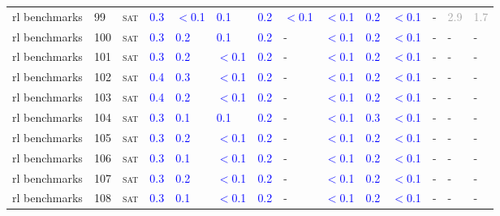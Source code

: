 \begin{center}
{\begin{longtable}{@{}llllllllllllll@{}}
rl benchmarks & 99 & \textsc{sat} & \textcolor{blue}{0.3} & \textcolor{blue}{$<$0.1} & \textcolor{blue}{0.1} & \textcolor{blue}{0.2} & \textcolor{blue}{$<$0.1} & \textcolor{blue}{$<$0.1} & \textcolor{blue}{0.2} & \textcolor{blue}{$<$0.1} & - & \textcolor{darkgray}{2.9} & \textcolor{darkgray}{1.7} \\
rl benchmarks & 100 & \textsc{sat} & \textcolor{blue}{0.3} & \textcolor{blue}{0.2} & \textcolor{blue}{0.1} & \textcolor{blue}{0.2} & - & \textcolor{blue}{$<$0.1} & \textcolor{blue}{0.2} & \textcolor{blue}{$<$0.1} & - & - & - \\
rl benchmarks & 101 & \textsc{sat} & \textcolor{blue}{0.3} & \textcolor{blue}{0.2} & \textcolor{blue}{$<$0.1} & \textcolor{blue}{0.2} & - & \textcolor{blue}{$<$0.1} & \textcolor{blue}{0.2} & \textcolor{blue}{$<$0.1} & - & - & - \\
rl benchmarks & 102 & \textsc{sat} & \textcolor{blue}{0.4} & \textcolor{blue}{0.3} & \textcolor{blue}{$<$0.1} & \textcolor{blue}{0.2} & - & \textcolor{blue}{$<$0.1} & \textcolor{blue}{0.2} & \textcolor{blue}{$<$0.1} & - & - & - \\
rl benchmarks & 103 & \textsc{sat} & \textcolor{blue}{0.4} & \textcolor{blue}{0.2} & \textcolor{blue}{$<$0.1} & \textcolor{blue}{0.2} & - & \textcolor{blue}{$<$0.1} & \textcolor{blue}{0.2} & \textcolor{blue}{$<$0.1} & - & - & - \\
rl benchmarks & 104 & \textsc{sat} & \textcolor{blue}{0.3} & \textcolor{blue}{0.1} & \textcolor{blue}{0.1} & \textcolor{blue}{0.2} & - & \textcolor{blue}{$<$0.1} & \textcolor{blue}{0.3} & \textcolor{blue}{$<$0.1} & - & - & - \\
rl benchmarks & 105 & \textsc{sat} & \textcolor{blue}{0.3} & \textcolor{blue}{0.2} & \textcolor{blue}{$<$0.1} & \textcolor{blue}{0.2} & - & \textcolor{blue}{$<$0.1} & \textcolor{blue}{0.2} & \textcolor{blue}{$<$0.1} & - & - & - \\
rl benchmarks & 106 & \textsc{sat} & \textcolor{blue}{0.3} & \textcolor{blue}{0.1} & \textcolor{blue}{$<$0.1} & \textcolor{blue}{0.2} & - & \textcolor{blue}{$<$0.1} & \textcolor{blue}{0.2} & \textcolor{blue}{$<$0.1} & - & - & - \\
rl benchmarks & 107 & \textsc{sat} & \textcolor{blue}{0.3} & \textcolor{blue}{0.2} & \textcolor{blue}{$<$0.1} & \textcolor{blue}{0.2} & - & \textcolor{blue}{$<$0.1} & \textcolor{blue}{0.2} & \textcolor{blue}{$<$0.1} & - & - & - \\
rl benchmarks & 108 & \textsc{sat} & \textcolor{blue}{0.3} & \textcolor{blue}{0.1} & \textcolor{blue}{$<$0.1} & \textcolor{blue}{0.2} & - & \textcolor{blue}{$<$0.1} & \textcolor{blue}{0.2} & \textcolor{blue}{$<$0.1} & - & - & - \\

\end{longtable}}
\end{center}
